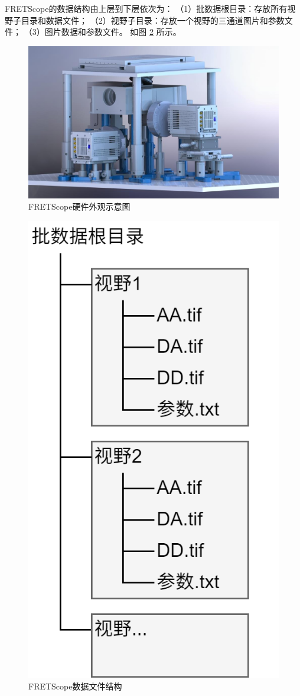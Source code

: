 FRETScope的数据结构由上层到下层依次为：
（1）批数据根目录：存放所有视野子目录和数据文件；
（2）视野子目录：存放一个视野的三通道图片和参数文件；
（3）图片数据和参数文件。
如图 \ref{fig:fretscope_data_struct} 所示。
\begin{figure}[hbtp]
  \centering
  \includegraphics[width=0.78\linewidth]{../figures/2/FRETScope示意图.jpg}
  \caption{FRETScope硬件外观示意图}
  \label{fig:fretscope2硬件示意图}
\end{figure}
\begin{figure}[htbp]
  \centering
  \includegraphics[height=0.55\linewidth]{../figures/2/FRETScope数据格式.drawio.png}
  \caption{FRETScope数据文件结构}
  \label{fig:fretscope_data_struct}
\end{figure}

